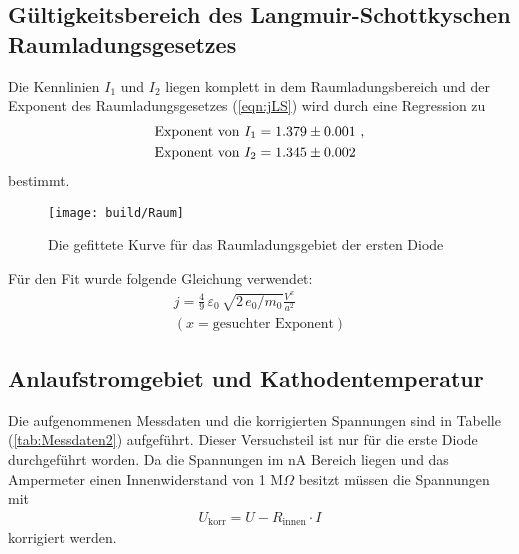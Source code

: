 \subsection{Gültigkeitsbereich des Langmuir-Schottkyschen Raumladungsgesetzes}
\label{sec:R}
Die Kennlinien $I_1$ und $I_2$ liegen komplett in dem Raumladungsbereich und der Exponent des Raumladungsgesetzes (\ref{eqn:jLS}) wird durch eine Regression zu
\begin{align*}
  \text{Exponent von}\ I_1 & =  \num{1.379 +- 0.001} \ , \\
  \text{Exponent von}\ I_2 & =  \num{1.345 +- 0.002}
\end{align*}
bestimmt.

\begin{figure}[H]
  \centering
  \texttt{[image: build/Raum]}
  \caption{Die gefittete Kurve für das Raumladungsgebiet der ersten Diode}
  \label{fig:}
\end{figure}

Für den Fit wurde folgende Gleichung verwendet:
\begin{align*}
  j = \frac{4}{9}\, \varepsilon_0\, \sqrt{2\, e_0/m_0}\frac{V^x}{a^2} \\
  (x = \text{gesuchter Exponent})
\end{align*}

\subsection{Anlaufstromgebiet und Kathodentemperatur}
\label{sec:A}
Die aufgenommenen Messdaten und die korrigierten Spannungen sind in Tabelle (\ref{tab:Messdaten2}) aufgeführt. Dieser Versuchsteil ist nur für die erste Diode durchgeführt worden. Da die Spannungen im nA Bereich liegen und das Ampermeter einen Innenwiderstand von 1 M$\Omega$ besitzt müssen die Spannungen mit
\begin{align*}
  U_\text{korr} = U - R_\text{innen} \cdot I
\end{align*}
korrigiert werden.

